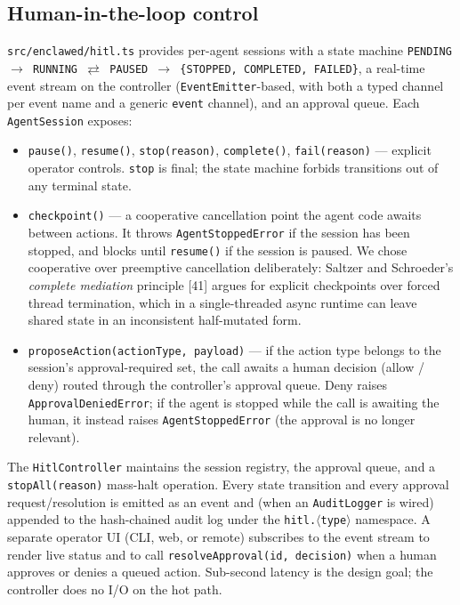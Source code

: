 \documentclass[11pt]{article}
\begin{document}
\subsection{Human-in-the-loop control}
\label{sec:hitl}

\texttt{src/enclawed/hitl.ts} provides per-agent sessions with a
state machine \texttt{PENDING $\to$ RUNNING $\rightleftarrows$ PAUSED
$\to$ \{STOPPED, COMPLETED, FAILED\}}, a real-time event stream on the
controller (\texttt{EventEmitter}-based, with both a typed channel per
event name and a generic \texttt{event} channel), and an approval
queue. Each \texttt{AgentSession} exposes:

\begin{itemize}
  \item \texttt{pause()}, \texttt{resume()}, \texttt{stop(reason)},
    \texttt{complete()}, \texttt{fail(reason)} --- explicit operator
    controls. \texttt{stop} is final; the state machine forbids
    transitions out of any terminal state.
  \item \texttt{checkpoint()} --- a cooperative cancellation point
    the agent code awaits between actions. It throws
    \texttt{AgentStoppedError} if the session has been stopped, and
    blocks until \texttt{resume()} if the session is paused. We chose
    cooperative over preemptive cancellation deliberately: Saltzer and
    Schroeder's \emph{complete mediation} principle [41] argues for
    explicit checkpoints over forced thread termination, which in a
    single-threaded async runtime can leave shared state in an
    inconsistent half-mutated form.
  \item \texttt{proposeAction(actionType, payload)} --- if the
    action type belongs to the session's approval-required set, the
    call awaits a human decision (allow / deny) routed through the
    controller's approval queue. Deny raises
    \texttt{ApprovalDeniedError}; if the agent is stopped while the
    call is awaiting the human, it instead raises
    \texttt{AgentStoppedError} (the approval is no longer relevant).
\end{itemize}

The \texttt{HitlController} maintains the session registry, the
approval queue, and a \texttt{stopAll(reason)} mass-halt operation.
Every state transition and every approval request/resolution is
emitted as an event and (when an \texttt{AuditLogger} is wired)
appended to the hash-chained audit log under the
\texttt{hitl.}$\langle$\texttt{type}$\rangle$ namespace. A separate
operator UI (CLI, web, or remote) subscribes to the event stream to
render live status and to call \texttt{resolveApproval(id, decision)}
when a human approves or denies a queued action. Sub-second latency
is the design goal; the controller does no I/O on the hot path.
\end{document}
